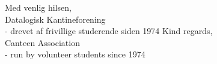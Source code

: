 \documentclass{article}
\providecommand{\content}[0]{}
\begin{document}
\thispagestyle{empty}

\ifdanish
\def\header{kantine-tekst}
\else
\def\header{kantine-text}
\fi

\ifportrait
{}
\else
{}
\fi
\null
\vspace{4cm}

\newlength{\mywidth}
\setlength{\mywidth}{\textwidth}
\addtolength{\mywidth}{-1cm}
\begin{center}
\begin{minipage}{\mywidth}
\fontsize{16}{16}\selectfont
\content{}
\end{minipage}
\end{center}

\null
\vfill

\rm

\Large

\begin{flushright}
\ifdanish
Med venlig hilsen,\\
Datalogisk Kantineforening\\
- drevet af frivillige studerende siden 1974
\else
Kind regards,\\
Canteen Association\\
- run by volunteer students since 1974
\fi
\end{flushright}
\end{document}
